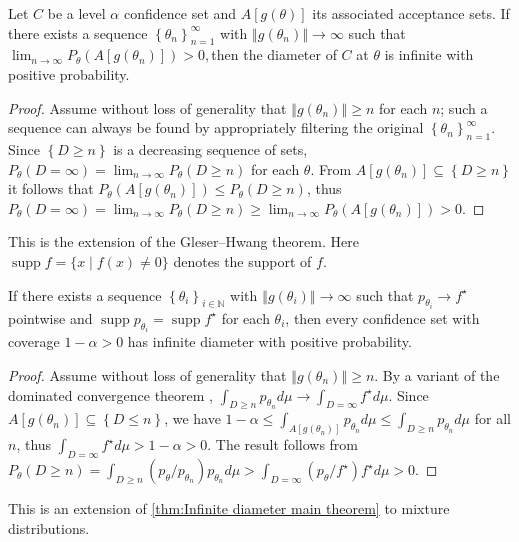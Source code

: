 \documentclass[twoside]{article}
\DeclareMathOperator{\supp}{supp}
\begin{document}
\begin{lem}
Let $C$ be a level $\alpha$ confidence set and $A[g(\theta)]$ its associated
acceptance sets. If there exists a sequence $\left\{ \theta_{n}\right\} _{n=1}^{\infty}$
with $\left\Vert g(\theta_{n})\right\Vert \to\infty$ such
that $\lim_{n\to\infty}P_{\theta}(A[g(\theta_{n})])>0,$then
the diameter of $C$ at $\theta$ is infinite with positive probability.
\end{lem}
\begin{proof}
Assume without loss of generality that $\left\Vert g(\theta_{n})\right\Vert \geq n$
for each $n$; such a sequence can always be found by appropriately
filtering the original $\left\{ \theta_{n}\right\} _{n=1}^{\infty}$.
Since $\left\{ D\geq n\right\} $ is a decreasing sequence of sets,
$P_{\theta}(D=\infty)=\lim_{n\to\infty}P_{\theta}(D\geq n)$
for each $\theta$. From $A[g(\theta_{n})]\subseteq\left\{ D\geq n\right\} $
it follows that $P_{\theta}(A[g(\theta_{n})])\leq P_{\theta}(D\geq n)$,
thus $P_{\theta}(D=\infty)=\lim_{n\to\infty}P_{\theta}(D\geq n)\geq\lim_{n\to\infty}P_{\theta}(A[g(\theta_{n})])>0$.
\end{proof}
This is the extension of the Gleser--Hwang theorem. Here $\supp f = \{x\mid f(x) \neq 0\}$ denotes the support of $f$.
\begin{thm}
\label{thm:Infinite diameter main theorem}If there exists a sequence
$\left\{ \theta_{i}\right\} _{i\in\mathbb{N}}$ with $\left\Vert g(\theta_{i})\right\Vert \to\infty$
such that $p_{\theta_{i}}\to f^{\star}$ pointwise and $\supp p_{\theta_i}=\supp f^{\star}$
for each $\theta_i$, then every confidence set with coverage $1-\alpha>0$
has infinite diameter with positive probability.
\end{thm}
\begin{proof}
Assume without loss of generality that $\left\Vert g(\theta_{n})\right\Vert \geq n$.
By a variant of the dominated convergence theorem \citep[Exercise 16.4a]{billingsley1995probability}, $\int_{D\geq n}p_{\theta_{n}}d\mu\to\int_{D=\infty}f^{\star}d\mu$.
Since $A[g(\theta_{n})]\subseteq\left\{ D\leq n\right\}$, we have 
$1-\alpha\leq\int_{A[g(\theta_{n})]}p_{\theta_{n}}d\mu\leq\int_{D\geq n}p_{\theta_{n}}d\mu$
for all $n$, thus $\int_{D=\infty}f^{\star}d\mu>1-\alpha>0$. The
result follows from $P_{\theta}(D\geq n)=\int_{D\geq n}(p_{\theta}/p_{\theta_{n}})p_{\theta_{n}}d\mu>\int_{D=\infty}(p_{\theta}/f^{\star})f^{\star}d\mu>0$.
\end{proof}
This is an extension of \cref{thm:Infinite diameter main theorem}
to mixture distributions.
\end{document}
